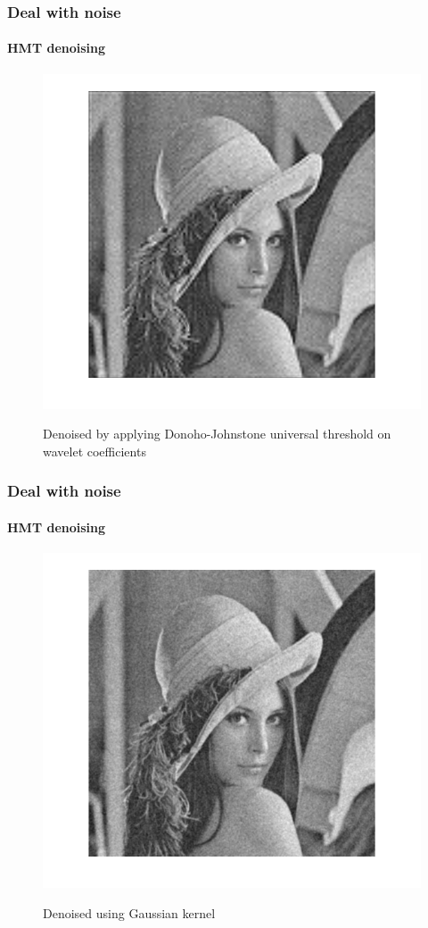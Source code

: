 \documentclass[12pt]{beamer}
\begin{document}
\begin{frame}
  \frametitle{Deal with noise}
  \framesubtitle{HMT denoising}
  \begin{figure}[H]
  \centering
  \includegraphics[scale=0.35]{../figs/lena_denoised_wavelet_thresholding}
  \label{fig:lena_denoised_wavelet_thresholding}
  \caption{Denoised by applying Donoho-Johnstone universal threshold on wavelet
  coefficients}
  \end{figure} 
\end{frame}

\begin{frame}
  \frametitle{Deal with noise}
  \framesubtitle{HMT denoising}
  
  \begin{figure}[H]
  \centering
  \includegraphics[scale=0.35]{../figs/lena_denoised_gaussian}
  \label{fig:lena_denoised_gaussian}
  \caption{Denoised using Gaussian kernel}
  \end{figure} 
\end{frame}
\end{document}

